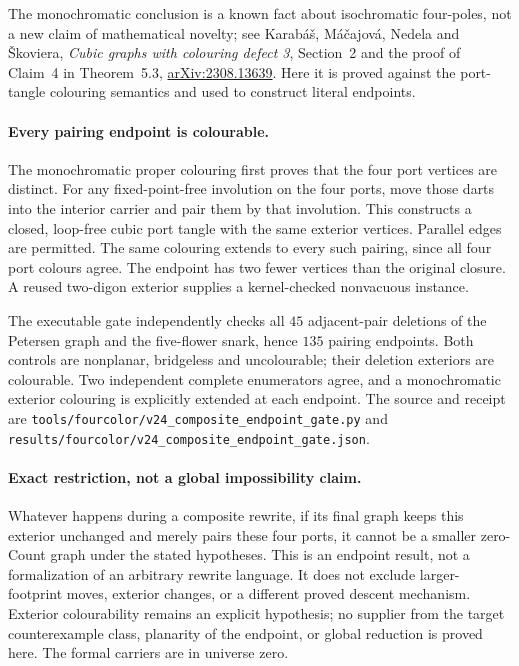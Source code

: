 The monochromatic conclusion is a known fact about isochromatic
four-poles, not a new claim of mathematical novelty; see Karab\'{a}\v{s},
M\'{a}\v{c}ajov\'{a}, Nedela and \v{S}koviera,
\emph{Cubic graphs with colouring defect 3}, Section~2 and the proof of
Claim~4 in Theorem~5.3,
\href{https://arxiv.org/abs/2308.13639}{arXiv:2308.13639}.
Here it is proved against the port-tangle colouring semantics and used
to construct literal endpoints.

\paragraph{Every pairing endpoint is colourable.}
The monochromatic proper colouring first proves that the four port
vertices are distinct. For any fixed-point-free involution on the four
ports, move those darts into the interior carrier and pair them by that
involution. This constructs a closed, loop-free cubic port tangle with
the same exterior vertices. Parallel edges are permitted. The same
colouring extends to every such pairing, since all four port colours agree.
The endpoint has two fewer vertices than the original closure.
A reused two-digon exterior supplies a kernel-checked nonvacuous instance.

The executable gate independently checks all $45$ adjacent-pair deletions
of the Petersen graph and the five-flower snark, hence $135$ pairing
endpoints. Both controls are nonplanar, bridgeless and uncolourable;
their deletion exteriors are colourable. Two independent complete
enumerators agree, and a monochromatic exterior colouring is explicitly
extended at each endpoint. The source and receipt are
\texttt{tools/fourcolor/v24\_composite\_endpoint\_gate.py} and
\texttt{results/fourcolor/v24\_composite\_endpoint\_gate.json}.

\paragraph{Exact restriction, not a global impossibility claim.}
Whatever happens during a composite rewrite, if its final graph keeps
this exterior unchanged and merely pairs these four ports, it cannot be
a smaller zero-Count graph under the stated hypotheses. This is an
endpoint result, not a formalization of an arbitrary rewrite language.
It does not exclude larger-footprint moves, exterior changes, or a
different proved descent mechanism. Exterior colourability remains an
explicit hypothesis; no supplier from the target counterexample class,
planarity of the endpoint, or global reduction is proved here. The
formal carriers are in universe zero.

